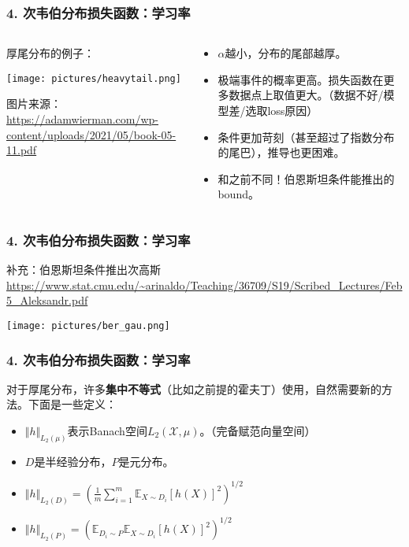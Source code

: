 \documentclass{beamer}
\begin{document}
\begin{frame}
    \frametitle{4. 次韦伯分布损失函数：学习率}
    \begin{columns}[T] %
        \begin{column}{.5\textwidth}
            厚尾分布的例子：
            \begin{center}
                \texttt{[image: pictures/heavytail.png]}
            \end{center}
            \tiny{图片来源：\url{https://adamwierman.com/wp-content/uploads/2021/05/book-05-11.pdf
            }}
        \end{column}%
        \begin{column}{.5\textwidth}
            \pause
            \begin{itemize}
                \item $\alpha$越小，分布的尾部越厚。
                \pause
                \item 极端事件的概率更高。损失函数在更多数据点上取值更大。（数据不好/模型差/选取loss原因）
                \pause
                \item 条件更加苛刻（甚至超过了指数分布的尾巴），推导也更困难。
                \pause
                \item 和之前{\color{red}{伯恩斯坦条件}}不同！伯恩斯坦条件能推出{\color{red}{次高斯}}的bound。
            \end{itemize}
        \end{column}
    \end{columns}
\end{frame}

\begin{frame}
    \frametitle{4. 次韦伯分布损失函数：学习率}
    补充：伯恩斯坦条件推出次高斯 \url{https://www.stat.cmu.edu/~arinaldo/Teaching/36709/S19/Scribed_Lectures/Feb5_Aleksandr.pdf}
    \begin{center}
        \texttt{[image: pictures/ber\_gau.png]}
    \end{center}
\end{frame}

\begin{frame}
    \frametitle{4. 次韦伯分布损失函数：学习率}
    对于厚尾分布，许多\textbf{集中不等式}（比如之前提的霍夫丁）{\color{red}{不能}}使用，自然需要新的方法。下面是一些定义：
    \begin{itemize}
        \item $\Vert h\Vert_{L_{2}(\mu)} $表示Banach空间$L_{2}(\mathcal{X},\mu)$。（完备赋范向量空间）
        \item $D$是半经验分布，$P$是元分布。
        \item $\Vert h\Vert_{L_{2}(D)} = (\frac{1}{m}\sum_{i=1}^{m}\mathbb{E}_{X\sim D_{i}}[h(X)]^{2})^{1/2}$
        \item $\Vert h\Vert_{L_{2}(P)} = (\mathbb{E}_{D_{i}\sim P}\mathbb{E}_{X\sim D_{i}}[h(X)]^{2})^{1/2}$
    \end{itemize}
\end{frame}
\end{document}
